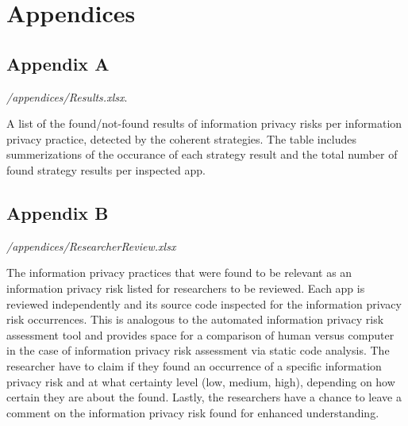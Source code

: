 \section*{Appendices}

\subsection*{Appendix A}

\textit{/appendices/Results.xlsx}. 

A list of the found/not-found results of information privacy risks per information privacy practice, detected by the coherent \AIPRAT strategies.
The table includes summerizations of the occurance of each strategy result and the total number of found strategy results per inspected app.

\subsection*{Appendix B}

\textit{/appendices/ResearcherReview.xlsx}

The information privacy practices that were found to be relevant as an information privacy risk listed for researchers to be reviewed.
Each app is reviewed independently and its source code inspected for the information privacy risk occurrences.
This is analogous to the automated information privacy risk assessment tool and provides space for a comparison of human versus computer in the case of information privacy risk assessment via static code analysis.
The researcher have to claim if they found an occurrence of a specific information privacy risk and at what certainty level (low, medium, high), depending on how certain they are about the found.
Lastly, the researchers have a chance to leave a comment on the information privacy risk found for enhanced understanding.